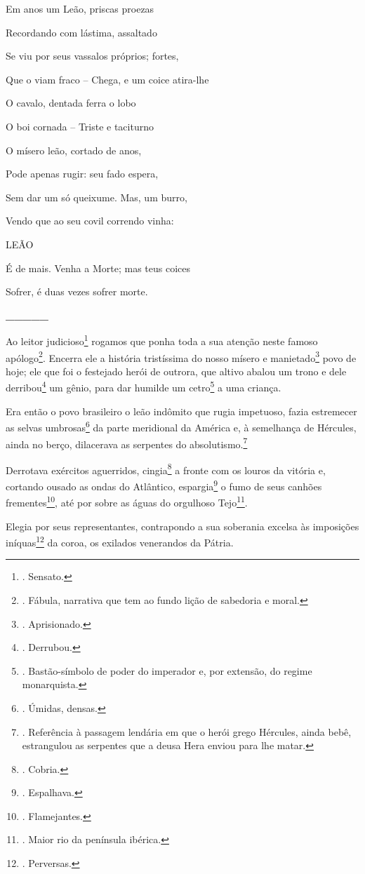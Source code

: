 Em anos um Leão, priscas proezas

Recordando com lástima, assaltado

Se viu por seus vassalos próprios; fortes,

Que o viam fraco -- Chega, e um coice atira-lhe

O cavalo, dentada ferra o lobo

O boi cornada -- Triste e taciturno

O mísero leão, cortado de anos,

Pode apenas rugir: seu fado espera,

Sem dar um só queixume. Mas, um burro,

Vendo que ao seu covil correndo vinha:

LEÃO

É de mais. Venha a Morte; mas teus coices

Sofrer, é duas vezes sofrer morte.

\textbf{\_\_\_\_\_}

Ao leitor judicioso\footnote{. Sensato.} rogamos que ponha toda a sua
atenção neste famoso apólogo\footnote{. Fábula, narrativa que tem ao
  fundo lição de sabedoria e moral.}. Encerra ele a história tristíssima
do nosso mísero e manietado\footnote{. Aprisionado.} povo de hoje; ele
que foi o festejado herói de outrora, que altivo abalou um trono e dele
derribou\footnote{. Derrubou.} um gênio, para dar humilde um
cetro\footnote{. Bastão-símbolo de poder do imperador e, por extensão,
  do regime monarquista.} a uma criança.

Era então o povo brasileiro o leão indômito que rugia impetuoso, fazia
estremecer as selvas umbrosas\footnote{. Úmidas, densas.} da parte
meridional da América e, à semelhança de Hércules, ainda no berço,
dilacerava as serpentes do absolutismo.\footnote{. Referência à passagem
  lendária em que o herói grego Hércules, ainda bebê, estrangulou as
  serpentes que a deusa Hera enviou para lhe matar.}

Derrotava exércitos aguerridos, cingia\footnote{. Cobria.} a fronte com
os louros da vitória e, cortando ousado as ondas do Atlântico,
espargia\footnote{. Espalhava.} o fumo de seus canhões
frementes\footnote{. Flamejantes.}, até por sobre as águas do orgulhoso
Tejo\footnote{. Maior rio da península ibérica.}.

Elegia por seus representantes, contrapondo a sua soberania excelsa às
imposições iníquas\footnote{. Perversas.} da coroa, os exilados
venerandos da Pátria.

